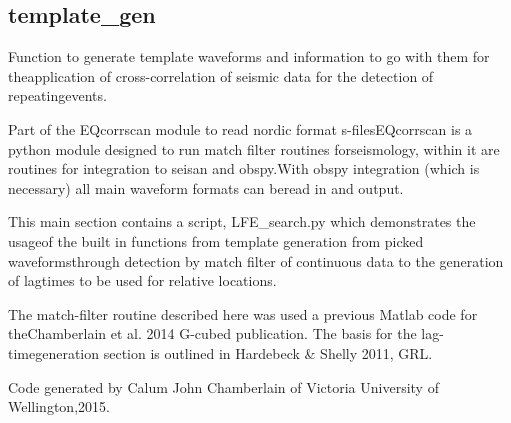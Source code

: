 \documentclass[a4paper,10pt,english]{sphinxmanual}
\begin{document}
\subsection{template\_gen}
\label{core:template-gen}\label{core:module-template_gen}
Function to generate template waveforms and information to go with them for theapplication of cross-correlation of seismic data for the detection of repeatingevents.

Part of the EQcorrscan module to read nordic format s-filesEQcorrscan is a python module designed to run match filter routines forseismology, within it are routines for integration to seisan and obspy.With obspy integration (which is necessary) all main waveform formats can beread in and output.

This main section contains a script, LFE\_search.py which demonstrates the usageof the built in functions from template generation from picked waveformsthrough detection by match filter of continuous data to the generation of lagtimes to be used for relative locations.

The match-filter routine described here was used a previous Matlab code for theChamberlain et al. 2014 G-cubed publication.  The basis for the lag-timegeneration section is outlined in Hardebeck \& Shelly 2011, GRL.

Code generated by Calum John Chamberlain of Victoria University of Wellington,2015.
\end{document}
